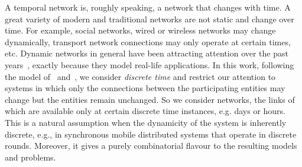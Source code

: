 \documentclass[a4paper,UKenglish]{article}
\begin{document}
A temporal network is, roughly speaking, a network that changes with time. A great variety of modern and traditional networks are not static and change over time. For example, social networks, wired or wireless networks may change dynamically, transport network connections may only operate at certain times, etc. Dynamic networks in general have been attracting attention over the past years~\cite{avin,xuan,casteigts,dutta,spirakisc}, exactly because they model real-life applications. In this work, following the model of~\cite{kempe, spirakis} and~\cite{akrida}, we consider \emph{discrete time} and restrict our attention to systems in which only the connections between the participating entities may change but the entities remain unchanged. So we consider networks, the links of which are available only at certain discrete time instances, e.g. days or hours. This is a natural assumption when the dynamicity of the system is inherently discrete, e.g., in synchronous mobile distributed systems that operate in discrete rounds. Moreover, it gives a purely combinatorial flavour to the resulting models and problems.
\end{document}
